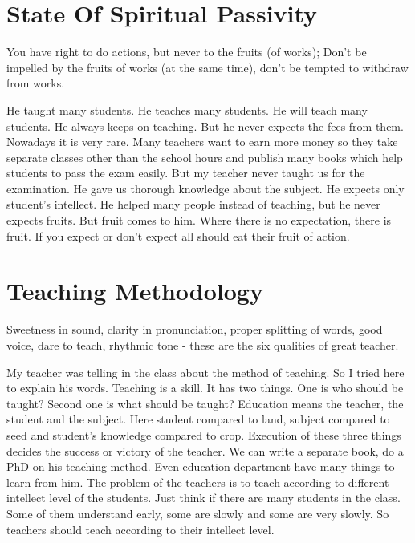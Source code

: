 \section{State Of Spiritual Passivity {\normalsize{}}}

\begin{verse} 
\end{verse}
You have right to do actions, but never to the fruits (of works); Don’t be impelled by the fruits of works (at the same time), don’t be tempted to withdraw from works.
      	
He taught many students. He teaches many students. He will teach many students. He always keeps on teaching. But he never expects the fees from them. Nowadays it is very rare. Many teachers want to earn more money so they take separate classes other than the school hours and publish many books which help students to pass the exam easily. But my teacher never taught us for the examination. He gave us thorough knowledge about the subject. He expects only student’s intellect. He helped many people instead of teaching, but he never expects fruits. But fruit comes to him. Where there is no expectation, there is fruit. If you expect or don’t expect all should eat their fruit of action.
 
\section{Teaching Methodology {\normalsize{}}}
 
\begin{verse}
\end{verse}
Sweetness in sound, clarity in pronunciation, proper splitting of words, good voice, dare to teach, rhythmic tone -  these are the six qualities of great teacher.
 
My teacher was telling in the class about the method of teaching. So I tried here to explain his words. Teaching is a skill. It has two things. One is who should be taught? Second one is what should be taught? Education means the teacher, the student and the subject. Here student compared to land, subject compared to seed and student’s knowledge compared to crop. Execution of these three things decides the success or victory of the teacher. We can write a separate book, do a PhD on his teaching method. Even education department have many things to learn from him. The problem of the teachers is to teach according to different intellect level of the students. Just think if there are many students in the class. Some of them understand early, some are slowly and some are very slowly. So teachers should teach according to their intellect level.
 
